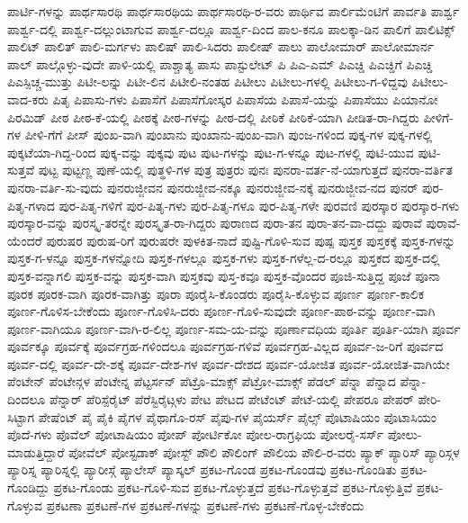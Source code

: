 {ಪಾರ್ಟಿ-ಗಳನ್ನು
ಪಾರ್ಥಸಾರಥಿ
ಪಾರ್ಥಸಾರಥಿಯ
ಪಾರ್ಥಸಾರಥಿ-ರ-ವರು
ಪಾರ್ಥಿವ
ಪಾರ್ಲಿಮೆಂಟಿಗೆ
ಪಾರ್ವತಿ
ಪಾರ್ಶ್ವ
ಪಾರ್ಶ್ವ-ದಲ್ಲಿ
ಪಾರ್ಶ್ವ-ದಲ್ಲುಂಟಾಗುವ
ಪಾರ್ಶ್ವ-ದಲ್ಲೂ
ಪಾರ್ಶ್ವ-ದಿಂದ
ಪಾಲ-ಕನೂ
ಪಾಲಕ್ಕಾ-ಡಿನ
ಪಾಲಿಗೆ
ಪಾಲಿಟಿಕ್ಸ್
ಪಾಲಿಟ್
ಪಾಲಿತ್
ಪಾಲಿ-ಮರ್ಗಳು
ಪಾಲಿಷ್
ಪಾಲಿ-ಸಿದರು
ಪಾಲೀಷ್
ಪಾಲು
ಪಾಲೋಮಾರ್
ಪಾಲೋಮಾರ್ನ
ಪಾಲ್
ಪಾಲ್ಗೊಳ್ಳು-ವುದೇ
ಪಾಳಿ-ಯಲ್ಲಿ
ಪಾಶ್ಚಾತ್ಯ
ಪಾಸು
ಪಾಸ್ಟುಲೇಟ್
ಪಿ
ಪಿಎ-ಎಮ್
ಪಿಎಚ್ಡಿ
ಪಿಎಚ್ಡಿಗೆ
ಪಿಎಚ್ಡಿ
ಪಿಎಸ್ಪಿಚ್ಚ-ಮುತ್ತು
ಪಿಟೀ-ಲನ್ನು
ಪಿಟೀ-ಲಿನ
ಪಿಟೀಲಿ-ನಂತಹ
ಪಿಟೀಲು
ಪಿಟೀಲು-ಗಳಲ್ಲಿ
ಪಿಟೀಲು-ಗ-ಳಿದ್ದವು
ಪಿಟೀಲು-ವಾದ-ಕರು
ಪಿತೃ
ಪಿಪಾಸು-ಗಳು
ಪಿಪಾಸೆಗೆ
ಪಿಪಾಸೆಗೋಸ್ಕರ
ಪಿಪಾಸೆಯ
ಪಿಪಾಸೆ-ಯನ್ನು
ಪಿಪಾಸೆಯು
ಪಿಯಾನೋ
ಪಿರಮಿಡ್
ಪೀಠ
ಪೀಠ-ಕೆ-ಯಲ್ಲಿ
ಪೀಠಕ್ಕೆ
ಪೀಠ-ಗಳನ್ನು
ಪೀಠ-ದಲ್ಲಿ
ಪೀಠಿಕೆ
ಪೀಠಿಕೆ-ಯಾಗಿ
ಪೀಡಿತ-ರಾ-ಗಿದ್ದರು
ಪೀಳಿಗೆ-ಗಳ
ಪೀಳಿ-ಗೆಗೆ
ಪೀಸ್
ಪುಂಖ-ವಾಗಿ
ಪುಂಖಾನು
ಪುಂಖಾನು-ಪುಂಖ-ವಾಗಿ
ಪುಂಜ-ಗಳಿಂದ
ಪುಕ್ಕ-ಗಳ
ಪುಕ್ಕ-ಗಳಲ್ಲಿ
ಪುಕ್ಕಟೆಯಾ-ಗಿದ್ದ-ರಿಂದ
ಪುಕ್ಕ-ವನ್ನು
ಪುಕ್ಕವು
ಪುಟ
ಪುಟ-ಗಳನ್ನು
ಪುಟ-ಗ-ಳನ್ನೂ
ಪುಟ-ಗಳಲ್ಲಿ
ಪುಟಿ-ಯುವ
ಪುಟಿ-ಸುತ್ತವೆ
ಪುಟ್ಟ
ಪುಟ್ಟಣ್ಣ
ಪುಣೆ-ಯಲ್ಲಿ
ಪುತ್ಥಳಿ-ಗಳ
ಪುತ್ರ
ಪುತ್ರರು
ಪುನಃ
ಪುನರಾ-ವರ್ತ-ನೆ-ಯಾಗುತ್ತದೆ
ಪುನರಾ-ವರ್ತಿತ
ಪುನರಾ-ವರ್ತಿ-ಸು-ವುದು
ಪುನರುಜ್ಜೀವನ
ಪುನರುಜ್ಜೀವ-ನಕ್ಕೂ
ಪುನರುಜ್ಜೀವ-ನಕ್ಕೆ
ಪುನರುಜ್ಜೀವ-ನದ
ಪುನರ್
ಪುರ-ಪಿತೃ-ಗಳಾದ
ಪುರ-ಪಿತೃ-ಗಳಿಗೆ
ಪುರ-ಪಿತೃ-ಗಳು
ಪುರ-ಪಿತೃ-ಗಳೂ
ಪುರ-ಪಿತೃ-ಗಳೇ
ಪುರವಣಿ
ಪುರಸ್ಕಾರ
ಪುರಸ್ಕಾರ-ಗಳು
ಪುರಸ್ಕಾರ-ವನ್ನು
ಪುರಸ್ಕೃ-ತರನ್ನೇ
ಪುರಸ್ಕೃತ-ರಾ-ಗಿದ್ದರು
ಪುರಾಣದ
ಪುರಾ-ತನ
ಪುರಾ-ತನ-ವಾ-ದದ್ದು
ಪುರಾವೆ
ಪುರಾವೆ-ಯೆಂದರೆ
ಪುರುಷರ
ಪುರುಷ-ರಿಗೆ
ಪುರುಷರೇ
ಪುಳಕಿತ-ನಾದೆ
ಪುಷ್ಟಿ-ಗೊಳಿ-ಸುವ
ಪುಷ್ಪ
ಪುಸ್ತಕ
ಪುಸ್ತಕಕ್ಕೆ
ಪುಸ್ತಕ-ಗಳನ್ನು
ಪುಸ್ತಕ-ಗ-ಳನ್ನೂ
ಪುಸ್ತಕ-ಗಳನ್ನೋದಿ
ಪುಸ್ತಕ-ಗಳಲ್ಲೂ
ಪುಸ್ತಕ-ಗಳು
ಪುಸ್ತಕ-ಗಳೆಲ್ಲ-ದ-ರಲ್ಲೂ
ಪುಸ್ತಕದ
ಪುಸ್ತಕ-ದಲ್ಲಿ
ಪುಸ್ತಕ-ವನ್ನಾಗಲಿ
ಪುಸ್ತಕ-ವನ್ನು
ಪುಸ್ತಕ-ವಾಗಿ
ಪುಸ್ತಕವು
ಪುಸ್ತ-ಕವೂ
ಪುಸ್ತಕ-ವೊಂದರ
ಪೂಜಿ-ಸುತ್ತಿದ್ದ
ಪೂಜೆ
ಪೂನಾ
ಪೂರಕ
ಪೂರಕ-ವಾಗಿ
ಪೂರಕ-ವಾಗಿತ್ತು
ಪೂರಾ
ಪೂರೈಸಿ-ಕೊಂಡರು
ಪೂರೈಸಿ-ಕೊಳ್ಳುವ
ಪೂರ್ಣ
ಪೂರ್ಣ-ಕಾಲಿಕ
ಪೂರ್ಣ-ಗೊಳಿಸ-ಬೇಕೆಂದು
ಪೂರ್ಣ-ಗೊಳಿಸಿ-ದರು
ಪೂರ್ಣ-ಗೊಳಿ-ಸುವುದೇ
ಪೂರ್ಣ-ಪಾಠ-ವನ್ನು
ಪೂರ್ಣ-ವಾಗಿ
ಪೂರ್ಣ-ವಾಗಿಯೂ
ಪೂರ್ಣ-ವಾಗಿ-ರ-ಲಿಲ್ಲ
ಪೂರ್ಣ-ಸಮ-ಯ-ವನ್ನು
ಪೂರ್ಣಾವಧಿಯ
ಪೂರ್ತಿ
ಪೂರ್ತಿ-ಯಾಗಿ
ಪೂರ್ವ
ಪೂರ್ವಕ್ಕೂ
ಪೂರ್ವಕ್ಕೆ
ಪೂರ್ವಗ್ರಹ-ಗಳಿಂದಲೂ
ಪೂರ್ವಗ್ರಹ-ಗಳಿವೆ
ಪೂರ್ವಗ್ರಹ-ವಿಲ್ಲದ
ಪೂರ್ವ-ಜ-ರಿಗೆ
ಪೂರ್ವದ
ಪೂರ್ವ-ದಲ್ಲಿ
ಪೂರ್ವ-ದೇ-ಶಕ್ಕೆ
ಪೂರ್ವ-ದೇಶ-ಗಳ
ಪೂರ್ವ-ದೇಶದ
ಪೂರ್ವ-ಯೋಜಿತ
ಪೂರ್ವ-ಯೋಜಿತ-ವಾಗಿಯೇ
ಪೆಂಟೇನ್
ಪೆಂಟೇನ್ಗಳ
ಪೆಂಟೇನ್ನ
ಪೆಟ್ಟರ್ಸನ್
ಪೆಟ್ರೊ-ಮಾಕ್ಸ್
ಪೆಟ್ರೋ-ಮಾಕ್ಸ್
ಪೆಡಲ್
ಪೆನ್ನಾ
ಪೆನ್ನಾದ
ಪೆನ್ನಾ-ದಿಂದಲೂ
ಪೆನ್ನಾರ್
ಪೆರಿಸ್ಪೆರೈಟ್
ಪೆರೆಸ್ಟಿರೈಟ್ಗಳು
ಪೇಟ
ಪೇಟದ
ಪೇಟೆಂಟ್
ಪೇಟೆ-ಯಲ್ಲಿ
ಪೇಪರೂ
ಪೇಪರ್
ಪೇರಿ-ಸಿಟ್ಟಾಗ
ಪೇಷೆಂಟ್
ಪೈ
ಪೈಕಿ
ಪೈಗಳ
ಪೈಥಾಗೊ-ರಸ್
ಪೈಪು-ಗಳ
ಪೈಯರ್ಸ್
ಪೈಲ್ಸ್
ಪೊಟಾಷಿಯಂ
ಪೊಟಾಸಿಯಂ
ಪೊದೆ-ಗಳು
ಪೊವೆಲ್
ಪೋಟಾಷಿಯಂ
ಪೋಪ್
ಪೋರ್ಟಿಕೋ
ಪೋಲ-ರಾಗ್ರಫಿಯ
ಪೋಲರೈ-ಸರ್ಸ್
ಪೋಲು-ಮಾಡುತ್ತಿದ್ದಾರೆ
ಪೋವೆಲ್
ಪೋಸ್ಟಡಾಕ್
ಪೋಸ್ಟ್
ಪೌಲಿ
ಪೌಲಿಂಗ್
ಪೌಲಿಯ
ಪೌಲಿ-ರ-ವರು
ಪ್ಯಾಕ್
ಪ್ಯಾರಿಸ್
ಪ್ಯಾರಿಸ್ಗಳ
ಪ್ಯಾರಿಸ್ನ
ಪ್ಯಾರಿಸ್ನಲ್ಲಿ
ಪ್ಯಾರೀಸ್ಗೆ
ಪ್ಯಾಲೇಸ್
ಪ್ಯಾಸ್ಕಲ್
ಪ್ರಕಟ-ಗೊಂಡ
ಪ್ರಕಟ-ಗೊಂಡವು
ಪ್ರಕಟ-ಗೊಂಡಿತು
ಪ್ರಕಟ-ಗೊಂಡಿದ್ದು
ಪ್ರಕಟ-ಗೊಂಡು
ಪ್ರಕಟ-ಗೊಳಿ-ಸುವ
ಪ್ರಕಟ-ಗೊಳ್ಳುತ್ತದೆ
ಪ್ರಕಟ-ಗೊಳ್ಳುತ್ತವೆ
ಪ್ರಕಟ-ಗೊಳ್ಳುತ್ತಿವೆ
ಪ್ರಕಟ-ಗೊಳ್ಳುವ
ಪ್ರಕಟಣಾ
ಪ್ರಕಟಣೆ-ಗಳ
ಪ್ರಕಟಣೆ-ಗಳನ್ನು
ಪ್ರಕಟಣೆ-ಗಳು
ಪ್ರಕಟಣೆ-ಗೊಳ್ಳ-ಬೇಕೆಂದು
}
